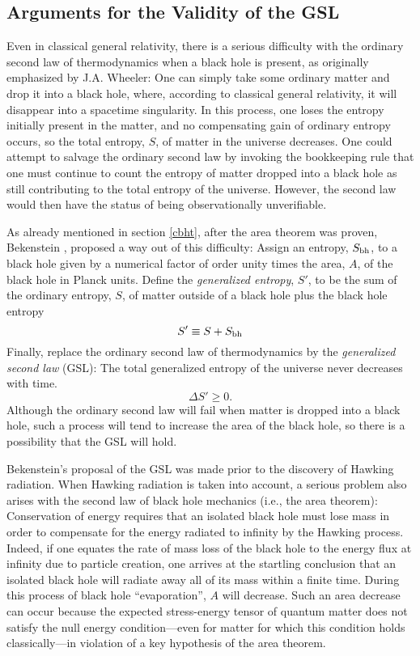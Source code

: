 \documentclass[12pt]{article}
\begin{document}
\subsection{Arguments for the Validity of the GSL}
\label{av}

Even in classical general relativity, there is a serious difficulty
with the ordinary second law of thermodynamics when a black hole is
present, as originally emphasized by J.A. Wheeler: One can simply take
some ordinary matter and drop it into a black hole, where, according
to classical general relativity, it will disappear into a spacetime
singularity. In this process, one loses the entropy initially present
in the matter, and no compensating gain of ordinary entropy occurs, so
the total entropy, $S$, of matter in the universe decreases. One could
attempt to salvage the ordinary second law by invoking the bookkeeping
rule that one must continue to count the entropy of matter dropped
into a black hole as still contributing to the total entropy of the
universe.  However, the second law would then have the status of being
observationally unverifiable.

As already mentioned in section \ref{cbht}, after the area theorem was
proven, Bekenstein \cite{b1}, \cite{b2} proposed a way out of this
difficulty: Assign an entropy, $S_{\rm bh}$, to a black hole given by a
numerical factor of order unity times the area, $A$, of the black hole in
Planck units. Define the {\it generalized entropy}, $S'$, to be the sum of
the ordinary entropy, $S$, of matter outside of a black hole plus the black
hole entropy
\begin{equation}
S' \equiv S + S_{\rm bh}
\label{S'}
\end{equation}
Finally, replace the ordinary second law of thermodynamics by the {\it
generalized second law} (GSL): The total generalized entropy of the
universe never decreases with time.
\begin{equation}
\Delta S' \geq 0 .
\label{GSL}
\end{equation}
Although the ordinary second law will fail when matter is dropped into
a black hole, such a process will tend to increase the area of the
black hole, so there is a possibility that the GSL will hold.

Bekenstein's proposal of the GSL was made prior to the discovery of
Hawking radiation. When Hawking radiation is taken into account, a
serious problem also arises with the second law of black hole
mechanics (i.e., the area theorem): Conservation of energy requires
that an isolated black hole must lose mass in order to compensate for
the energy radiated to infinity by the Hawking process. Indeed, if one
equates the rate of mass loss of the black hole to the energy flux at
infinity due to particle creation, one arrives at the startling
conclusion that an isolated black hole will radiate away all of its
mass within a finite time. During this process of black hole
``evaporation'', $A$ will decrease. Such an area decrease can occur
because the expected stress-energy tensor of quantum matter does not
satisfy the null energy condition---even for matter for which this
condition holds classically---in violation of a key hypothesis of the
area theorem.
\end{document}
